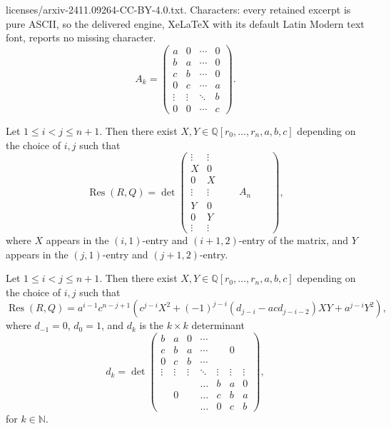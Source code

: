 \documentclass[10pt,a4paper]{amsart}
\DeclareMathOperator{\Res}{Res}
\newcommand{\NN}{\mathbb{N}}
\newcommand{\Q}{\mathbb{Q}}
\renewcommand{\leq}{\leqslant}
\begin{document}
licenses/arxiv-2411.09264-CC-BY-4.0.txt. Characters: every retained excerpt is pure ASCII, so the delivered engine, XeLaTeX with its default Latin Modern text font, reports no missing character.
\begin{equation}\label{eq:Ak}
A_k=
\begin{pmatrix}
 a& 0& \cdots  & 0 \\
b& a&  \cdots& 0     \\
c& b& \cdots  & 0\\
0& c& \cdots  & a \\
 \vdots&\vdots & \ddots  & b  \\
  0&  0&\cdots & c
\end{pmatrix}.\end{equation}

\begin{lemma}\label{lem:res1}
Let $1\leq i<j\leq n+1$. Then there exist $X,Y\in\Q[r_0,\dots, r_n,a,b,c]$ depending on the choice of $i,j$ such that 
$$
\Res(R,Q)=
\det
\begin{pmatrix}
\vdots & \vdots & &&&& \\
X     & 0     & &&&&\\
0     & X     & &&&&\\
\vdots & \vdots &&&A_n&& \\
Y     & 0     &  &&&&\\ 
0     & Y     &     &&&&\\
\vdots & \vdots & &&&&
\end{pmatrix},
$$
where $X$ appears in the $(i,1)$-entry and $(i+1,2)$-entry of the matrix,  and $Y$ appears in the $(j,1)$-entry and $(j+1,2)$-entry.
\end{lemma}

\begin{lemma}\label{lem:res2}
Let $1\leq i<j\leq n+1$.
Then there exist $X,Y\in\Q[r_0,\dots, r_n,a,b,c]$ depending on the choice of $i,j$ such that 
\[
\Res(R,Q)
=a^{i-1}c^{n-j+1}\left(c^{j-i}X^2+(-1)^{j-i}(d_{j-i}-acd_{j-i-2})XY+a^{j-i}Y^2\right),
\]
where 
$d_{-1}=0$,  $d_0=1$, and $d_k$ is the $k\times k$ determinant 
\[d_k=\det
\begin{pmatrix}
b & a & 0& \cdots  & &  & \\
c & b& a&  \cdots & &  0&\\
0 & c& b& \cdots &  &  & \\
\vdots & \vdots &\vdots & \ddots  &\vdots &\vdots &\vdots \\ 
   &    &  & \dots& b& a&  0\\
   & 0  &   &\dots& c& b&  a\\
   &    &  &\dots & 0& c&  b
\end{pmatrix},
\]
for $k\in \NN$.
\end{lemma}
\end{document}
